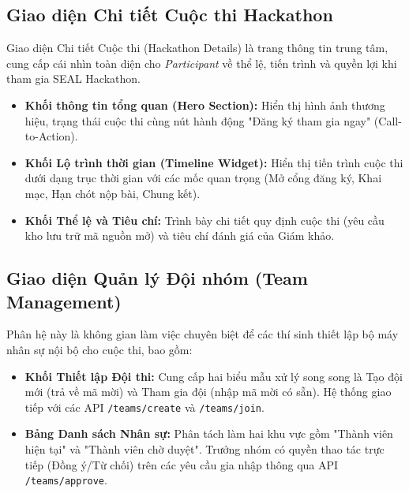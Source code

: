 	\subsection{Giao diện Chi tiết Cuộc thi Hackathon}
	Giao diện Chi tiết Cuộc thi (Hackathon Details) là trang thông tin trung tâm, cung cấp cái nhìn toàn diện cho \textit{Participant} về thể lệ, tiến trình và quyền lợi khi tham gia SEAL Hackathon.
	\begin{itemize}
		\item \textbf{Khối thông tin tổng quan (Hero Section):} Hiển thị hình ảnh thương hiệu, trạng thái cuộc thi cùng nút hành động "Đăng ký tham gia ngay" (Call-to-Action).
		\item \textbf{Khối Lộ trình thời gian (Timeline Widget):} Hiển thị tiến trình cuộc thi dưới dạng trục thời gian với các mốc quan trọng (Mở cổng đăng ký, Khai mạc, Hạn chót nộp bài, Chung kết).
		\item \textbf{Khối Thể lệ và Tiêu chí:} Trình bày chi tiết quy định cuộc thi (yêu cầu kho lưu trữ mã nguồn mở) và tiêu chí đánh giá của Giám khảo.
	\end{itemize}
	
	\subsection{Giao diện Quản lý Đội nhóm (Team Management)}
	Phân hệ này là không gian làm việc chuyên biệt để các thí sinh thiết lập bộ máy nhân sự nội bộ cho cuộc thi, bao gồm:
	\begin{itemize}
		\item \textbf{Khối Thiết lập Đội thi:} Cung cấp hai biểu mẫu xử lý song song là Tạo đội mới (trả về mã mời) và Tham gia đội (nhập mã mời có sẵn). Hệ thống giao tiếp với các API \texttt{/teams/create} và \texttt{/teams/join}.
		\item \textbf{Bảng Danh sách Nhân sự:} Phân tách làm hai khu vực gồm "Thành viên hiện tại" và "Thành viên chờ duyệt". Trưởng nhóm có quyền thao tác trực tiếp (Đồng ý/Từ chối) trên các yêu cầu gia nhập thông qua API \texttt{/teams/approve}.
	\end{itemize}
	
